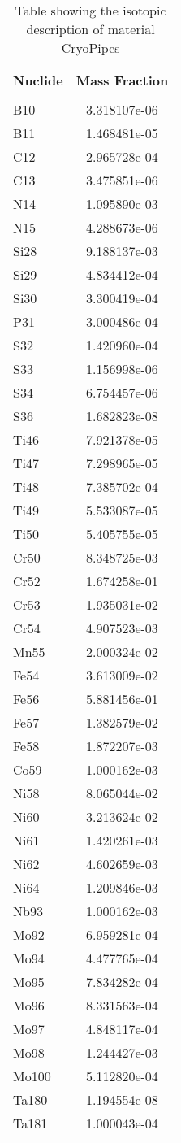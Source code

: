 \begin{centering}
\begin{table}[ht!]
\begin{tabular}{l | c}
\hline
Nuclide & Mass Fraction\\
\hline
\\
B10 & 3.318107e-06\\
B11 & 1.468481e-05\\
C12 & 2.965728e-04\\
C13 & 3.475851e-06\\
N14 & 1.095890e-03\\
N15 & 4.288673e-06\\
Si28 & 9.188137e-03\\
Si29 & 4.834412e-04\\
Si30 & 3.300419e-04\\
P31 & 3.000486e-04\\
S32 & 1.420960e-04\\
S33 & 1.156998e-06\\
S34 & 6.754457e-06\\
S36 & 1.682823e-08\\
Ti46 & 7.921378e-05\\
Ti47 & 7.298965e-05\\
Ti48 & 7.385702e-04\\
Ti49 & 5.533087e-05\\
Ti50 & 5.405755e-05\\
Cr50 & 8.348725e-03\\
Cr52 & 1.674258e-01\\
Cr53 & 1.935031e-02\\
Cr54 & 4.907523e-03\\
Mn55 & 2.000324e-02\\
Fe54 & 3.613009e-02\\
Fe56 & 5.881456e-01\\
Fe57 & 1.382579e-02\\
Fe58 & 1.872207e-03\\
Co59 & 1.000162e-03\\
Ni58 & 8.065044e-02\\
Ni60 & 3.213624e-02\\
Ni61 & 1.420261e-03\\
Ni62 & 4.602659e-03\\
Ni64 & 1.209846e-03\\
Nb93 & 1.000162e-03\\
Mo92 & 6.959281e-04\\
Mo94 & 4.477765e-04\\
Mo95 & 7.834282e-04\\
Mo96 & 8.331563e-04\\
Mo97 & 4.848117e-04\\
Mo98 & 1.244427e-03\\
Mo100 & 5.112820e-04\\
Ta180 & 1.194554e-08\\
Ta181 & 1.000043e-04
\end{tabular}
\caption{Table showing the isotopic description of material CryoPipes}
\label{table:material_CryoPipes}
\end{table}\clearpage


\end{centering}
